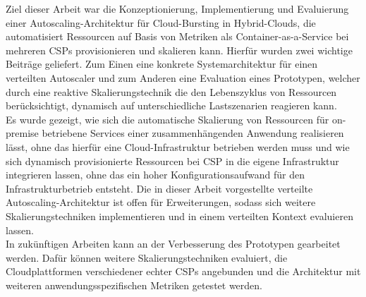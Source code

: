 \documentclass[runningheads]{llncs}
\begin{document}
Ziel dieser Arbeit war die Konzeptionierung, Implementierung und Evaluierung einer Autoscaling-Architektur für Cloud-Bursting in Hybrid-Clouds, die automatisiert Ressourcen auf Basis von Metriken als Container-as-a-Service bei mehreren CSPs provisionieren und skalieren kann. Hierfür wurden zwei wichtige Beiträge geliefert. Zum Einen eine konkrete Systemarchitektur für einen verteilten Autoscaler und zum Anderen eine Evaluation eines Prototypen, welcher durch eine reaktive Skalierungstechnik die den Lebenszyklus von Ressourcen berücksichtigt, dynamisch auf unterschiedliche Lastszenarien reagieren kann. \\

Es wurde gezeigt, wie sich die automatische Skalierung von Ressourcen für on-premise betriebene Services einer zusammenhängenden Anwendung realisieren lässt, ohne das hierfür eine Cloud-Infrastruktur betrieben werden muss und wie sich dynamisch provisionierte Ressourcen bei CSP in die eigene Infrastruktur integrieren lassen, ohne das ein hoher Konfigurationsaufwand für den Infrastrukturbetrieb entsteht. Die in dieser Arbeit vorgestellte verteilte Autoscaling-Architektur ist offen für Erweiterungen, sodass sich weitere Skalierungstechniken implementieren und in einem verteilten Kontext evaluieren lassen. \\

In zukünftigen Arbeiten kann an der Verbesserung des Prototypen gearbeitet werden. Dafür können weitere Skalierungstechniken evaluiert, die Cloudplattformen verschiedener echter CSPs angebunden und die Architektur mit weiteren anwendungsspezifischen Metriken getestet werden.
	
%
%
\newpage


%
\end{document}
